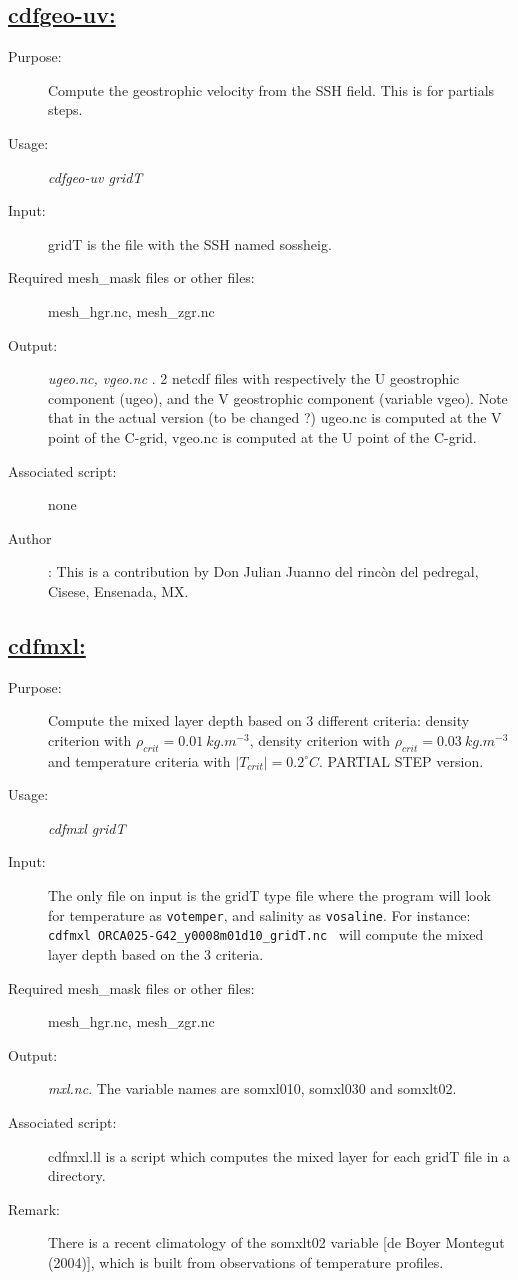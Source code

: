 \documentclass[a4paper,11pt]{article}
\begin{document}
\subsection*{\underline{cdfgeo-uv:}}
\begin{description}
\item[Purpose:] Compute the geostrophic velocity from the SSH field.  This is for partials steps.
\item[Usage:] {\em cdfgeo-uv gridT  }\\
\item[Input:] gridT is the file with the SSH named sossheig.

\item[Required mesh\_mask files or other files:] mesh\_hgr.nc, mesh\_zgr.nc
\item[Output:] {\em ugeo.nc, vgeo.nc }. 2 netcdf files with respectively the U geostrophic component (ugeo), and the V geostrophic
          component (variable vgeo). Note that in the actual version (to be changed ?) ugeo.nc is computed at the V point of the 
      C-grid, vgeo.nc is computed at the U point of the C-grid.
\item[Associated script:] none
\item[Author]: This is a contribution by Don Julian Juanno del rinc\`on del pedregal, Cisese, Ensenada, MX.
\end{description}


\newpage
\subsection*{\underline{cdfmxl:}}
\begin{description}
\item[Purpose:] Compute the mixed layer depth based on 3 different criteria: density criterion with $\rho_{crit}=0.01~kg.m^{-3}$,
density criterion with  $\rho_{crit}=0.03~kg.m^{-3}$ and temperature criteria with $ |T_{crit}|=0.2^\circ C $. PARTIAL STEP version.
\item[Usage:] {\em cdfmxl  gridT }\\
\item[Input:]  The only file on input is the gridT type file where the program will look for temperature as {\tt votemper},
and salinity as {\tt vosaline}.
For instance: {\tt cdfmxl   ORCA025-G42\_y0008m01d10\_gridT.nc } 
will compute  the mixed layer depth based on the 3 criteria.
\item[Required mesh\_mask files or other files:] mesh\_hgr.nc, mesh\_zgr.nc
\item[Output:] {\em mxl.nc}. The variable names are somxl010, somxl030 and somxlt02.
\item[Associated script:] cdfmxl.ll is a script which computes the mixed layer for each gridT file in a directory.
\item[Remark:] There is a  recent climatology of the somxlt02 variable [de Boyer Montegut \etal (2004)], which is built from
observations of temperature profiles. 
\end{description}
\end{document}
